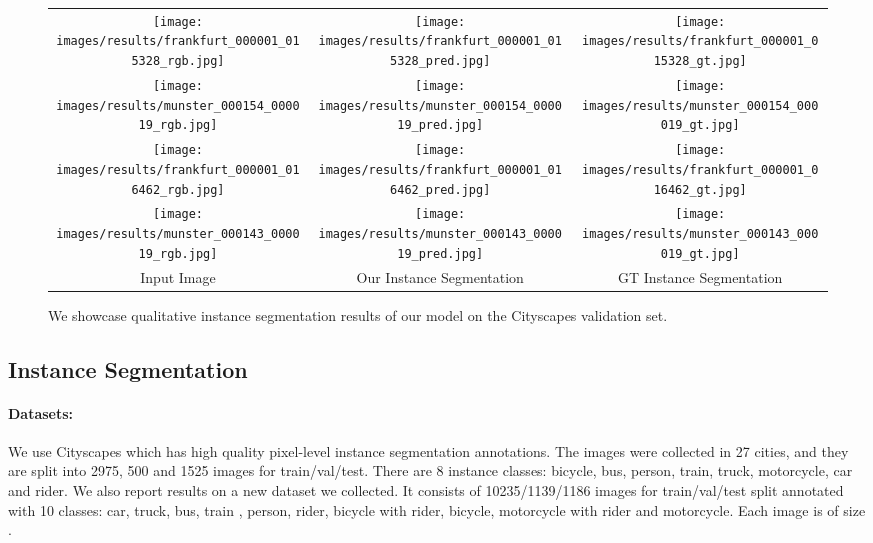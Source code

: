 \documentclass[10pt,twocolumn,letterpaper]{article}
\begin{document}
\begin{figure*} [t!]
\vspace{-0.5cm}
\centering
\setlength\tabcolsep{2pt}
\begin{tabular}{ccc}

\texttt{[image: images/results/frankfurt\_000001\_015328\_rgb.jpg]} &
\texttt{[image: images/results/frankfurt\_000001\_015328\_pred.jpg]} &
\texttt{[image: images/results/frankfurt\_000001\_015328\_gt.jpg]}\\

\texttt{[image: images/results/munster\_000154\_000019\_rgb.jpg]} &
\texttt{[image: images/results/munster\_000154\_000019\_pred.jpg]} &
\texttt{[image: images/results/munster\_000154\_000019\_gt.jpg]}\\

\texttt{[image: images/results/frankfurt\_000001\_016462\_rgb.jpg]} &
\texttt{[image: images/results/frankfurt\_000001\_016462\_pred.jpg]} &
\texttt{[image: images/results/frankfurt\_000001\_016462\_gt.jpg]}\\

\texttt{[image: images/results/munster\_000143\_000019\_rgb.jpg]} &
\texttt{[image: images/results/munster\_000143\_000019\_pred.jpg]} &
\texttt{[image: images/results/munster\_000143\_000019\_gt.jpg]}\\

Input Image & Our Instance Segmentation & GT Instance Segmentation

\end{tabular}
\caption{We showcase qualitative instance segmentation results of our model on the Cityscapes validation set.}
\label{fig:results}
\vspace{-4mm}
\end{figure*}
 
\subsection{Instance Segmentation}  \label{ssec:instance-seg}

\paragraph{Datasets:}
We use Cityscapes \cite{cityscapes} which has high quality pixel-level instance segmentation annotations. The  images were collected in  27  cities, and  they are split into 2975, 500 and 1525 images for train/val/test. There are 8 instance classes: bicycle, bus, person, train, truck, motorcycle, car and rider.  
We also report results on a new  dataset we collected. It consists of 10235/1139/1186  images for train/val/test split annotated with 10 classes: car, truck, bus, train , person, rider, bicycle with rider, bicycle, motorcycle with rider and motorcycle. Each image is of size . 
\end{document}
